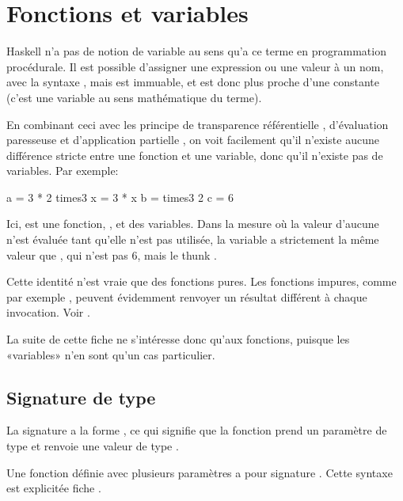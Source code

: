 \section{Fonctions et variables}
\label{functions-and-variables}

Haskell n'a pas de notion de variable au sens qu'a ce terme en programmation procédurale. Il est possible d'assigner une expression ou une valeur à un nom, avec la syntaxe , mais  est immuable, et est donc plus proche d'une constante (c'est une variable au sens mathématique du terme).

En combinant ceci avec les principe de transparence référentielle , d'évaluation paresseuse  et d'application partielle , on voit facilement qu'il n'existe aucune différence stricte entre une fonction et une variable, donc qu'il n'existe pas de variables. Par exemple:

\begin{haskellcode}
a = 3 * 2
times3 x = 3 * x
b = times3 2
c = 6
\end{haskellcode}

Ici,  est une fonction, ,  et  des variables. Dans la mesure où la valeur d'aucune n'est évaluée tant qu'elle n'est pas utilisée, la variable  a strictement la même valeur que , qui n'est pas 6, mais le \gls{thunk} .

\begin{warnbox}
Cette identité n'est vraie que des fonctions pures. Les fonctions impures, comme par exemple , peuvent évidemment renvoyer un résultat différent à chaque invocation. Voir .
\end{warnbox}

La suite de cette fiche ne s'intéresse donc qu'aux fonctions, puisque les «variables» n'en sont qu'un cas particulier.

\subsection{Signature de type}
\label{type-signatures}

La signature a la forme , ce qui signifie que la fonction prend un paramètre de type  et renvoie une valeur de type .

Une fonction définie avec plusieurs paramètres a pour signature . Cette syntaxe est explicitée fiche .

